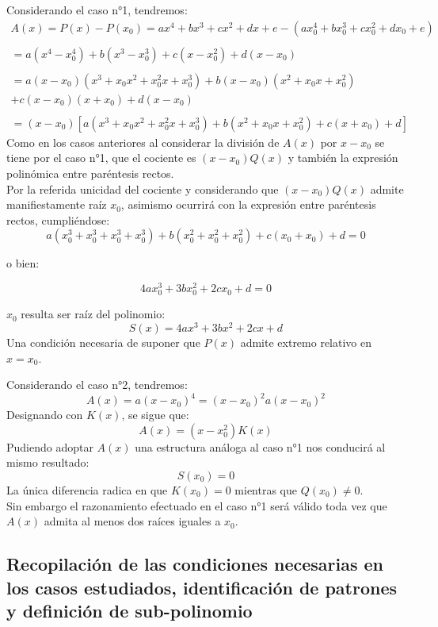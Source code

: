 \documentclass[12pt]{article}
\begin{document}
Considerando el caso n°1, tendremos:
$$
  \begin{array}{lll}
    A(x)=P(x)-P({x}_0)=ax^4+bx^3+cx^2+dx+e-(a{x}_0^4+b{x}_0^3+c{x}_0^2+d{x}_0+e) \\
    \\
    =a(x^4-{x}_0^4)+b(x^3-{x}_0^3)+c(x-{x}_0^2)+d(x-{x}_0)                       \\
    \\
    =a(x-{x}_0)(x^3+{x}_0x^2+{x}_0^2x+{x}_0^3)+b(x-{x}_0)(x^2+{x}_0x+{x}_0^2)    \\
    +c(x-{x}_0)(x+{x}_0)+d(x-{x}_0)                                              \\
    \\
    =(x-{x}_0)[a(x^3+{x}_0x^2+{x}_0^2x+{x}_0^3)+b(x^2+{x}_0x+{x}_0^2)+c(x+{x}_0)+d]
  \end{array}
$$
Como en los casos anteriores al considerar la división de $A(x)$ por $x-{x}_0$ se tiene por el caso n°1, que el cociente es $(x-{x}_0)Q(x)$ y también la expresión polinómica entre paréntesis rectos. \\
Por la referida unicidad del cociente y considerando que $(x-{x}_0)Q(x)$ admite manifiestamente raíz ${x}_0$, asimismo ocurrirá con la expresión entre paréntesis rectos, cumpliéndose:
$$
  a({x}_0^3+{x}_0^3+{x}_0^3+{x}_0^3)+b({x}_0^2+{x}_0^2+{x}_0^2)+c({x}_0+{x}_0)+d=0
$$
\begin{center}
  o bien:
\end{center}
$$
  4a{x}_0^3+3b{x}_0^2+2c{x}_0+d=0
$$

${x}_0$ resulta ser raíz del polinomio:
$$
  S(x)=4ax^3+3bx^2+2cx+d
$$
Una condición necesaria de suponer que $P(x)$ admite extremo relativo en $x={x}_0$.

Considerando el caso n°2, tendremos:
$$
  A(x)=a(x-{x}_0)^4=(x-{x}_0)^2a(x-{x}_0)^2
$$
Designando con $K(x)$, se sigue que:
$$
  A(x)=(x-{x}_0^2)K(x)
$$
Pudiendo adoptar $A(x)$ una estructura análoga al caso n°1 nos conducirá al mismo resultado:
$$
  S({x}_0)=0
$$
La única diferencia radica en que $K({x}_0)=0$ mientras que $Q({x}_0)\neq0$. \\
Sin embargo el razonamiento efectuado en el caso n°1 será válido toda vez que $A(x)$ admita al menos dos raíces iguales a ${x}_0$. \\


\subsection{
  Recopilación de las condiciones necesarias en los casos estudiados, identificación de patrones y definición de sub-polinomio
}
\end{document}
